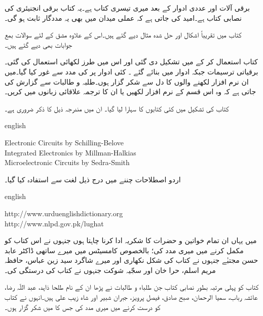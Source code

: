 \thispagestyle{empty}
برقی آلات اور عددی ادوار کے بعد  میری تیسری کتاب ہے۔یہ کتاب  برقی انجنیئری کی نصابی کتاب  ہے۔امید کی جاتی ہے کہ عملی میدان میں  بھی یہ مددگار ثابت ہو گی۔

کتاب میں تقریباً  اشکال اور  حل شدہ مثال دیے  گئے ہیں۔اس کے علاوہ  مشق کے لئے   سوالات  بمع جوابات بھی دیے گئے ہیں۔

کتاب  استعمال  کر کے   میں تشکیل دی گئی  اور اس میں    طرز    لکھائی  استعمال کی گئی۔برقیاتی ترسیمات   جبکہ ادوار  میں بنائے گئے  ۔ کئی ادوار پر  کی مدد سے غور کیا گیا۔میں ان نرم افزار لکھنے والوں کا دل سے شکر گزار ہوں۔طلبہ و طالبات سے گزارش   کی جاتی ہے  کہ وہ اس قسم کے نرم افزار لکھیں یا ان کا ترجمہ علاقائی زبانوں میں کریں۔

کتاب کی تشکیل میں کئی کتابوں کا سہارا لیا گیا۔ ان میں مندرجہ ذیل کا ذکر ضروری ہے۔

{
\begin{otherlanguage*}{english}
\begin{LTR}
Electronic Circuits by Schilling-Belove\\
Integrated Electronics by Millman-Halkias\\
Microelectronic Circuits by Sedra-Smith
\end{LTR}
\end{otherlanguage*}
}

اردو اصطلاحات چننے میں درج ذیل لغت سے استفادہ  کیا گیا۔ 

{
\begin{otherlanguage*}{english}
\begin{LTR}
http:/\!\!/www.urduenglishdictionary.org\\
http:/\!\!/www.nlpd.gov.pk/lughat
\end{LTR}
\end{otherlanguage*}
}

میں یہاں ان تمام خواتین و حضرات کا شکریہ ادا کرنا چاہتا ہوں جنہوں نے اس کتاب کو مکمل کرنے میں میری مدد کی؛ بالخصوص کامسیٹس میں میرے ساتھی ڈاکٹر عابد حسن مجتبٰے جنہوں نے کتاب کی شکل نکھاری اور میرے شاگرد سید زین عباس، حافظہ مریم اسلم، حرا خان اور  سجّیہ شوکت  جنہوں نے  کتاب کی درستگی کی۔ 

 کتاب کو پہلی مرتبہ بطور نصابی کتاب جن طلباء و طالبات نے پڑھا ان کے نام طلحا ذاہد، عبد اللّہ رضا، عائشہ رباب، سمیا الرحمان، صبح صادق، فیصل پرویز، جبران شبیر اور شاہ زیب علی ہیں۔انہوں نے کتاب کو درست کرنے میں میری مدد کی جس کا میں شکر گزار ہوں۔

